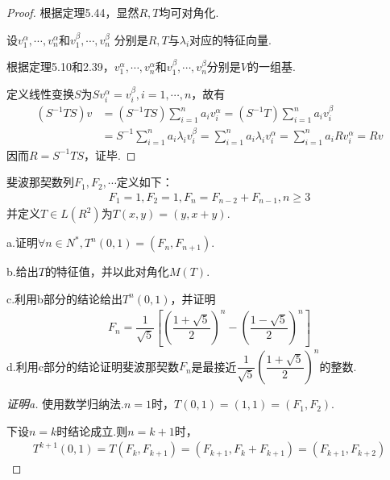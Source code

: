 \begin{proof}
    根据定理5.44，显然\(R,T\)均可对角化.

    设\(v_1^\alpha,\cdots,v_n^\alpha\)和\(v_1^\beta,\cdots,v_n^\beta\)
    分别是\(R,T\)与\(\lambda_i\)对应的特征向量.
    
    根据定理5.10和2.39，\(v_1^\alpha,\cdots,v_n^\alpha\)和\(v_1^\beta,\cdots,v_n^\beta\)分别是\(V\)的一组基.
    
    定义线性变换\(S\)为\(Sv_i^\alpha=v_i^\beta,i=1,\cdots,n\)，故有
    \begin{align*}
        (S^{-1}TS)v &=(S^{-1}TS)\sum_{i=1}^n a_iv_i^\alpha=(S^{-1}T)\sum_{i=1}^n a_iv_i^\beta \\
                    &=S^{-1}\sum_{i=1}^n a_i\lambda_i v_i^\beta=\sum_{i=1}^n a_i\lambda_i v_i^\alpha
                        =\sum_{i=1}^n a_iRv_i^\alpha=Rv
    \end{align*}
    因而\(R=S^{-1}TS\)，证毕.
\end{proof}

\newpage

\begin{problem}[16]\label{5.C.16}
    斐波那契数列\(F_1,F_2,\cdots\)定义如下：
    \begin{align*}
        F_1=1,F_2=1,F_n=F_{n-2}+F_{n-1},n \geq 3
    \end{align*}
    并定义\(T \in L(R^2)\)为\(T(x,y)=(y,x+y)\).

    a.证明\(\forall n \in N^*,T^n(0,1)=(F_n,F_{n+1})\).

    b.给出\(T\)的特征值，并以此对角化\(M(T)\).
    
    c.利用b部分的结论给出\(T^n(0,1)\)，并证明
    \begin{align*}
        F_n=\dfrac{1}{\sqrt{5}}[(\dfrac{1+\sqrt{5}}{2})^n-(\dfrac{1-\sqrt{5}}{2})^n]
    \end{align*}
    d.利用c部分的结论证明{\kaishu 斐波那契数}\(F_n\)是最接近\(\dfrac{1}{\sqrt{5}}(\dfrac{1+\sqrt{5}}{2})^n\)的整数.
\end{problem}

\begin{proof}[证明a]
    使用数学归纳法.\(n=1\)时，\(T(0,1)=(1,1)=(F_1,F_2)\).

    下设\(n=k\)时结论成立.则\(n=k+1\)时，
    \begin{align*}
        T^{k+1}(0,1)=T(F_k,F_{k+1})=(F_{k+1},F_k+F_{k+1})=(F_{k+1},F_{k+2})
    \end{align*}
\end{proof}

